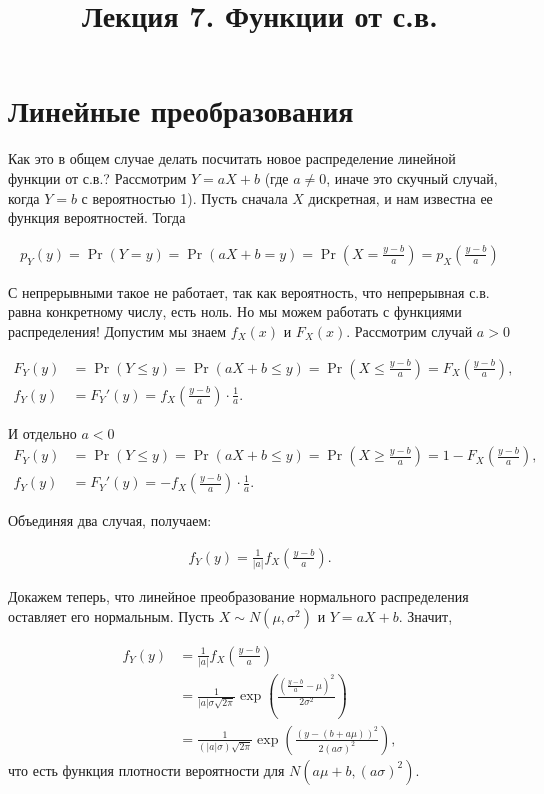 \documentclass[12pt]{article}
\title{Лекция 7. Функции от с.в.}
\begin{document}
\maketitle

\section{Линейные преобразования}

Как это в общем случае делать посчитать новое распределение линейной функции от с.в.? Рассмотрим $Y = aX + b$ (где $a \ne 0$, иначе это скучный случай, когда $Y = b$ с вероятностью 1). Пусть сначала $X$ дискретная, и нам известна ее функция вероятностей. Тогда

\begin{align*}
  p_Y(y) = \Pr(Y = y) = \Pr(aX + b = y) = \Pr\left(X = \frac{y - b}{a}\right) = p_X\left( \frac{y - b}{a}\right)
\end{align*}

С непрерывными такое не работает, так как вероятность, что непрерывная с.в. равна конкретному числу, есть ноль. Но мы можем работать с функциями распределения! Допустим мы знаем $f_X(x)$ и $F_X(x)$. Рассмотрим случай $a > 0$

\begin{align*}
  F_Y(y) &= \Pr(Y \le y) = \Pr(aX + b \le y) = \Pr\left(X \le \frac{y - b}{a}\right) = F_X\left(\frac{y - b}{a}\right), \\
  f_Y(y) &= F_Y'(y) = f_X\left(\frac{y - b}{a}\right) \cdot \frac{1}{a}.
\end{align*}

И отдельно $a < 0$
\begin{align*}
  F_Y(y) &= \Pr(Y \le y) = \Pr(aX + b \le y) = \Pr\left(X \ge \frac{y - b}{a}\right) = 1 - F_X\left(\frac{y - b}{a}\right), \\
  f_Y(y) &= F_Y'(y) = -f_X\left(\frac{y - b}{a}\right) \cdot \frac{1}{a}.
\end{align*}

Объединяя два случая, получаем:

\begin{align*}
  f_Y(y) = \frac{1}{|a|}f_X\left(\frac{y - b}{a}\right).
\end{align*}

Докажем теперь, что линейное преобразование нормального распределения оставляет его нормальным. Пусть $X \sim N(\mu, \sigma^2)$ и $Y = aX + b$. Значит,

\begin{align*}
  f_Y(y) &= \frac{1}{|a|}f_X\left(\frac{y - b}{a}\right) \\
         &= \frac{1}{|a|\sigma \sqrt{2\pi}} \exp\left(\frac{\left(\frac{y - b}{a} - \mu\right)^2}{2\sigma^2}\right) \\
         &= \frac{1}{(|a|\sigma) \sqrt{2\pi}} \exp\left(\frac{\left(y - (b + a\mu)\right)^2}{2(a\sigma)^2}\right),
\end{align*}
что есть функция плотности вероятности для $N(a\mu + b, (a\sigma)^2)$.
\end{document}
